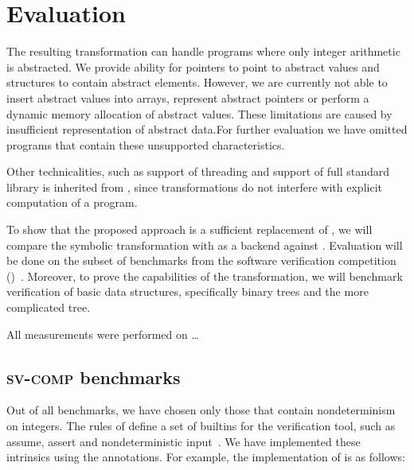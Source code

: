 \chapter{Evaluation}\label{ch:results}

The resulting transformation can handle programs where only integer
arithmetic is abstracted. We provide ability for pointers to point to
abstract values and structures to contain abstract elements. However, we are
currently not able to insert abstract values into arrays, represent abstract
pointers or perform a dynamic memory allocation of abstract values. These
limitations are caused by insufficient representation of abstract
data.For further evaluation we have omitted programs that contain
these unsupported characteristics.

Other technicalities, such as support of threading and support of full \Cpp{}
standard library is inherited from \DIVINE, since transformations do not
interfere with explicit computation of a program.

To show that the proposed approach is a sufficient replacement of \SymDIVINE, we
will compare the symbolic transformation with \DIVINE as a backend against
\SymDIVINE. Evaluation will be done on the subset of benchmarks from the software
verification competition (\svcomp)~\cite{Beyer17}.
Moreover, to prove the capabilities of the transformation, we will benchmark
verification of basic data structures, specifically binary trees and the more
complicated \AVL tree.

All measurements were performed on \dots
{}

\section{\textsc{sv-comp} benchmarks}

Out of all \svcomp benchmarks, we have chosen only those that contain
nondeterminism on integers. The rules of \svcomp define a set of builtins for the
verification tool, such as assume, assert and nondeterministic
input~\cite{svcomp}. We have implemented these intrinsics using the annotations.
For example, the implementation of  is as
follows:

